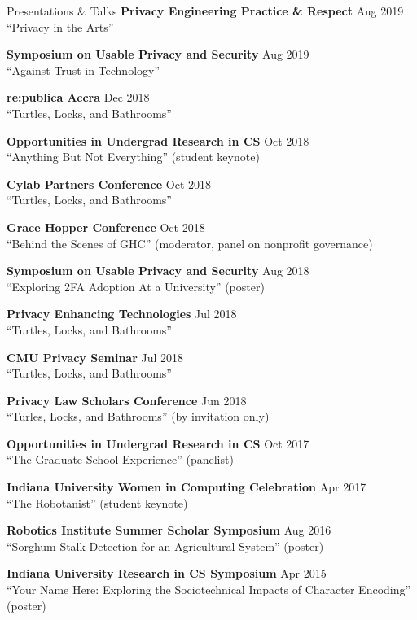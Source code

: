 \documentclass{resume} %
\begin{document}
\begin{rSection}{Presentations \& Talks}
	{\bf Privacy Engineering Practice \& Respect} \hfill Aug 2019 \\
		``Privacy in the Arts'' 
		
	{\bf Symposium on Usable Privacy and Security} \hfill Aug 2019 \\
		``Against Trust in Technology'' 
	
	{\bf re:publica Accra} \hfill Dec 2018 \\
		``Turtles, Locks, and Bathrooms'' 

	{\bf Opportunities in Undergrad Research in CS} \hfill Oct 2018 \\ 
		``Anything But Not Everything'' (student keynote)

	{\bf Cylab Partners Conference}  \hfill Oct 2018 \\ 
		``Turtles, Locks, and Bathrooms''

	{\bf Grace Hopper Conference} \hfill Oct 2018 \\ 
		``Behind the Scenes of GHC'' (moderator, panel on nonprofit governance)

	{\bf Symposium on Usable Privacy and Security} \hfill Aug 2018 \\ 
		``Exploring 2FA Adoption At a University'' (poster) 

	{\bf Privacy Enhancing Technologies} \hfill Jul 2018 \\ 
		``Turtles, Locks, and Bathrooms'' 

	{\bf CMU Privacy Seminar}  \hfill Jul 2018 \\ 
		``Turtles, Locks, and Bathrooms''

	{\bf Privacy Law Scholars Conference} \hfill Jun 2018 \\ 
		``Turles, Locks, and Bathrooms'' (by invitation only) 

	{\bf Opportunities in Undergrad Research in CS} \hfill Oct 2017 \\ 
		``The Graduate School Experience'' (panelist) \

	{\bf Indiana University Women in Computing Celebration} \hfill Apr 2017 \\ 
		``The Robotanist'' (student keynote) 

	{\bf Robotics Institute Summer Scholar Symposium} \hfill Aug 2016 \\ 
		``Sorghum Stalk Detection for an Agricultural System'' (poster) 

	{\bf Indiana University Research in CS Symposium} \hfill Apr 2015 \\
		``Your Name Here: Exploring the Sociotechnical Impacts of Character Encoding'' (poster)  

\end{rSection}
\end{document}
